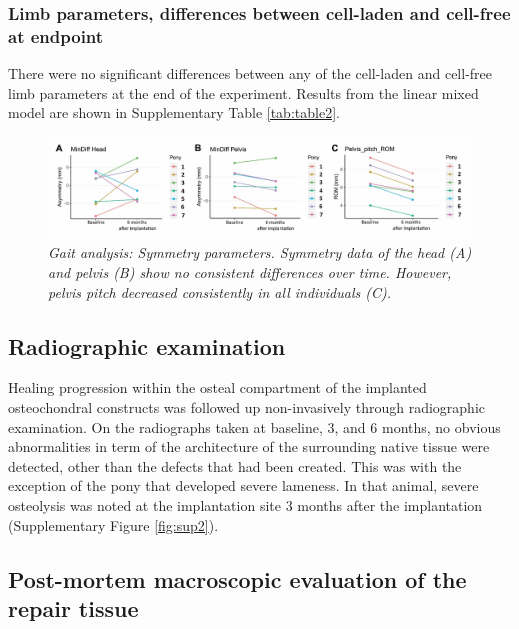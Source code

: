 \documentclass[twocolumn, serif, empirical, authordate, seplic]{jote-article}
\begin{document}
 {}\subsubsection*{Limb parameters, differences between cell-laden and cell-free at endpoint} 

There were no significant differences between any of the cell-laden and cell-free limb parameters at the end of the experiment. Results from the linear mixed model are shown in Supplementary Table \ref{tab:table2}.

\begin{figure}
\centering \includegraphics[width=\textwidth]{articles/empirical/horse/media/image6.jpg}
\caption{\emph{Gait analysis: Symmetry parameters. \textit{Symmetry data of the head (A) and pelvis (B) show no consistent differences over time. However, pelvis pitch decreased consistently in all individuals (C).}}}
\label{fig:figure6}\end{figure}


 {}\subsection*{Radiographic examination} 

Healing progression within the osteal compartment of the implanted osteochondral constructs was followed up non-invasively through radiographic examination. On the radiographs taken at baseline, 3, and 6 months, no obvious abnormalities in term of the architecture of the surrounding native tissue were detected, other than the defects that had been created. This was with the exception of the pony that developed severe lameness. In that animal, severe osteolysis was noted at the implantation site 3 months after the implantation (Supplementary Figure \ref{fig:sup2}).

 {}\subsection*{Post-mortem macroscopic evaluation of the repair tissue} 
\end{document}
